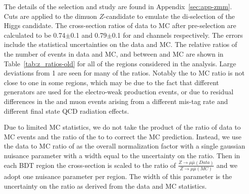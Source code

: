 The details of the \zmujets{} selection and study are found in Appendix~\ref{sec:app-zmm}.  Cuts are applied to the dimuon $Z$-candidate to emulate the di-\bjet selection of the Higgs candidate.  The cross-section ratios of data to MC after pre-selection are calculated to be 0.74$\pm$0.1 and 0.79$\pm$0.1 for \twocentral and \fourcentral channels respectively.  The errors include the statistical uncertainties on the data and MC. The relative ratios of the number of events in data and MC, and between \zjets{} and \zmujets{} MC are shown in Table~\ref{tab:z_ratios-old} for all of the regions considered in the analysis.  Large deviations from 1 are seen for many of the ratios.  Notably the \zmujets{} to \zjets MC ratio is not close to one in some regions, which may be due to the fact that different generators are used for the electro-weak production events, or due to residual differences in the \bjet and muon events arising from a different mis-tag rate and different final state QCD radiation effects.

Due to limited \zjets{} MC statistics, we do not take the product of the ratio of data to MC \zmujets{} events and the ratio of the \zmujets{} to \zjets{} to correct the \zjets{} MC prediction.  Instead, we use the data to MC ratio of \zmujets{} as the overall normalization factor with a  single gaussian nuisance parameter with a width equal to the uncertainty on the ratio.  Then in each BDT region the cross-section is scaled to the ratio of $\frac{Z\rightarrow \mu \bar \mu(Data)}{Z\rightarrow \mu \bar \mu(MC)}$ and we adopt one nuisance parameter per region.  The width of this parameter is the uncertainty on the ratio as derived from the data and MC statistics.   




